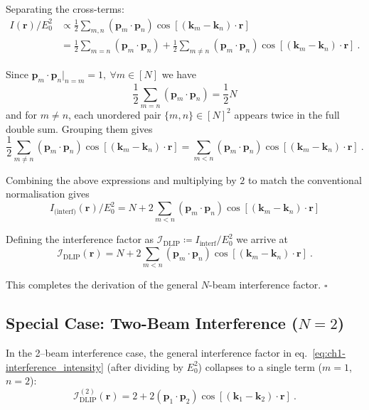 \noindent
Separating the cross-terms:
\begin{align*}
   I(\mathbf{r})/E_0^2
   & \propto \frac{1}{2}\sum_{m,n} (\mathbf{p}_m \cdot \mathbf{p}_n)
   \cos[(\mathbf{k}_m - \mathbf{k}_n) \cdot \mathbf{r}] \\
   & = \frac{1}{2}\sum_{m=n} (\mathbf{p}_m \cdot \mathbf{p}_n)
   + \frac{1}{2}\sum_{m \neq n} (\mathbf{p}_m \cdot \mathbf{p}_n)
   \cos[(\mathbf{k}_m - \mathbf{k}_n) \cdot \mathbf{r}] \ .
\end{align*}

\noindent
Since $\mathbf{p}_m \cdot \mathbf{p}_n\vert_{n=m} = 1, \ \forall m \in [N]$ we have
\[
   \frac{1}{2}\sum_{m=n} (\mathbf{p}_m \cdot \mathbf{p}_n) = \frac{1}{2} N
\]
and for $m \neq n$, each unordered pair $\{m,n\} \in [N]^2$ appears twice in the full double sum.
Grouping them gives
\[
   \frac{1}{2}\sum_{m \neq n} (\mathbf{p}_m \cdot \mathbf{p}_n) \cos[(\mathbf{k}_m - \mathbf{k}_n) \cdot \mathbf{r}] = \sum_{m < n} (\mathbf{p}_m \cdot \mathbf{p}_n) \cos[(\mathbf{k}_m - \mathbf{k}_n) \cdot \mathbf{r}] \ .
\]

Combining the above expressions and multiplying by $2$ to match the conventional normalisation gives
\begin{equation}
   I_\text{(interf)}(\mathbf{r})/E_0^2 = N + 2\sum_{m < n} (\mathbf{p}_m \cdot \mathbf{p}_n) \cos[(\mathbf{k}_m - \mathbf{k}_n) \cdot \mathbf{r}]
\end{equation}

Defining the interference factor as $\mathcal{I}_\text{DLIP} \coloneqq I_\text{interf}/E_0^2$ we arrive at
\begin{equation}
   \mathcal{I}_{\text{DLIP}}(\mathbf{r}) = N + 2 \sum_{m < n} (\mathbf{p}_m \cdot \mathbf{p}_n) \cos[(\mathbf{k}_m - \mathbf{k}_n)\cdot \mathbf{r}] \ .
\end{equation}

This completes the derivation of the general $N$-beam interference factor.
$\square$

\subsection{Special Case: Two-Beam Interference (\(N=2\))}

In the 2--beam interference case,
the general interference factor in eq.~\eqref{eq:ch1-interference_intensity} (after dividing by $E_0^2$) collapses to a single term ($m=1$, $n=2$):
\begin{equation}
   \mathcal{I}_\text{DLIP}^{(2)}(\mathbf{r}) = 2 + 2(\mathbf{p}_1 \cdot \mathbf{p}_2) \cos[(\mathbf{k}_1 - \mathbf{k}_2) \cdot \mathbf{r}] \ .
\end{equation}

